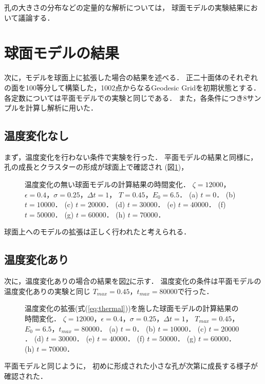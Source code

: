 孔の大きさの分布などの定量的な解析については，
球面モデルの実験結果において議論する．


\section{球面モデルの結果}
次に，モデルを球面上に拡張した場合の結果を述べる．
正二十面体のそれぞれの面を100等分して構築した，1002点からなるGeodesic Gridを初期状態とする．
各定数については平面モデルでの実験と同じである．
また，各条件につき8サンプルを計算し解析に用いた．


\subsection{温度変化なし}
まず，温度変化を行わない条件で実験を行った．
平面モデルの結果と同様に，
孔の成長とクラスターの形成が球面上で確認され
(図\ref{fig:result_sphere_without_anearing})，
\begin{figure}
    \centering
    
    \caption{
        温度変化の無い球面モデルの計算結果の時間変化．
        $\zeta=12000$，$\epsilon=0.4$，$\sigma=0.25$，$\Delta t=1$，
        $T=0.45$，$E_0=6.5$．
        (a) $t=0$．
        (b) $t=10000$．
        (c) $t=20000$．
        (d) $t=30000$．
        (e) $t=40000$．
        (f) $t=50000$．
        (g) $t=60000$．
        (h) $t=70000$．
    }
    \label{fig:result_sphere_without_anearing}
\end{figure}
球面上へのモデルの拡張は正しく行われたと考えられる．


\subsection{温度変化あり}
次に，温度変化ありの場合の結果を図\ref{fig:result_sphere_with_anearing}に示す．
温度変化の条件は平面モデルの温度変化ありの実験と同じ
$T_{max}=0.45$，$t_{max}=80000$で行った．

\begin{figure}
    \centering
    
    \caption{
        温度変化の拡張(式(\ref{eq:thermal}))を施した球面モデルの計算結果の時間変化．
        $\zeta=12000$，$\epsilon=0.4$，$\sigma=0.25$，$\Delta t=1$，
        $T_{max}=0.45$，$E_0=6.5$，$t_{max}=80000$．
        (a) $t=0$．
        (b) $t=10000$．
        (c) $t=20000$．
        (d) $t=30000$．
        (e) $t=40000$．
        (f) $t=50000$．
        (g) $t=60000$．
        (h) $t=70000$．
    }
    \label{fig:result_sphere_with_anearing}
\end{figure}
平面モデルと同じように，
初めに形成された小さな孔が次第に成長する様子が確認された．

